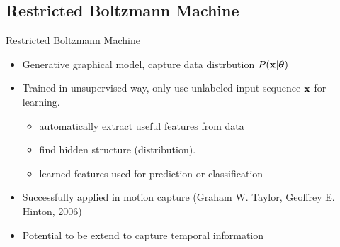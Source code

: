 \subsection{Restricted Boltzmann Machine}
	\begin{frame}[t]{Restricted Boltzmann Machine}
	 \begin{itemize}
	  \itemsep10pt
	  \item Generative graphical model, capture data distrbution $P(\mathbf{x}|\boldsymbol{\theta})$
	  \item Trained in unsupervised way, only use unlabeled input sequence $\mathbf{x}$ for learning. 
		  \begin{itemize}
		   \item automatically extract useful features from data 
		   \item find hidden structure (distribution). 
		   \item learned features used for prediction or classification
		  \end{itemize}
	  \item Successfully applied in motion capture (Graham W. Taylor, Geoffrey E. Hinton, 2006)
	  \item Potential to be extend to capture temporal information
	 \end{itemize}
	\end{frame}
	
